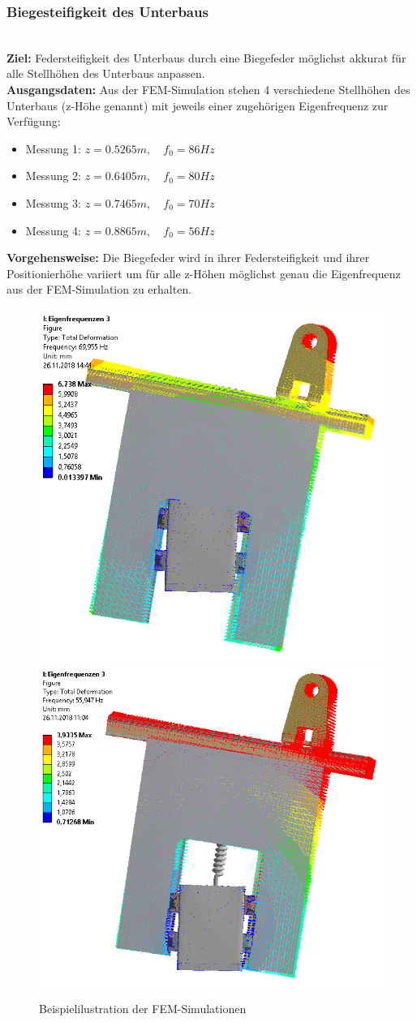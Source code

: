 \documentclass[10pt,a4paper]{iace.report}
\begin{document}
				 \subsubsection{Biegesteifigkeit des Unterbaus}\leavevmode\\
				 	\textbf{Ziel: } Federsteifigkeit des Unterbaus durch eine Biegefeder möglichst akkurat für alle Stellhöhen des Unterbaus anpassen.\\
				 	\textbf{Ausgangsdaten: } Aus der FEM-Simulation stehen 4 verschiedene Stellhöhen des Unterbaus (z-Höhe genannt) mit jeweils einer zugehörigen Eigenfrequenz zur Verfügung:
				 	\begin{itemize}
				 		\item Messung 1: $ z=0.5265m, \quad f_{0}=86Hz $
				 		\item Messung 2: $ z=0.6405m, \quad f_{0}=80Hz $
				 		\item Messung 3: $ z=0.7465m, \quad f_{0}=70Hz $
				 		\item Messung 4: $ z=0.8865m, \quad f_{0}=56Hz $
				 	\end{itemize}
				 	\textbf{Vorgehensweise: } Die Biegefeder wird in ihrer Federsteifigkeit und ihrer Positionierhöhe variiert um für alle z-Höhen möglichst genau die Eigenfrequenz aus der FEM-Simulation zu erhalten.					
					\begin{figure}[h!]
						\centering
						\includegraphics[width=0.40\linewidth]{./pics/fem_unterbau3.png}
						\includegraphics[width=0.45\linewidth]{./pics/fem_unterbau4.png}
						\caption{Beispielilustration der FEM-Simulationen}
					\end{figure}\leavevmode\\\\
\end{document}
